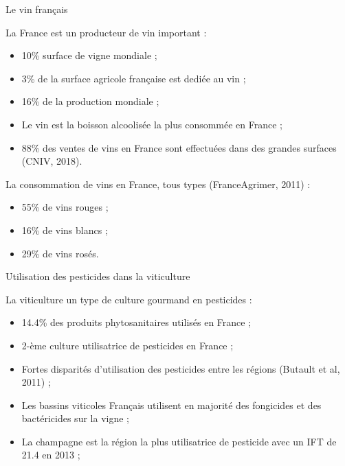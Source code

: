 \documentclass[11pt,ignorenonframetext,]{beamer}
\providecommand{\tightlist}{%
  \setlength{\itemsep}{0pt}\setlength{\parskip}{0pt}}
\begin{document}
\begin{frame}{Le vin français}
\protect\hypertarget{le-vin-francais}{}

La France est un producteur de vin important :

\begin{itemize}
\tightlist
\item
  10\% surface de vigne mondiale ;
\item
  3\% de la surface agricole française est dediée au vin ;
\item
  16\% de la production mondiale ;
\item
  Le vin est la boisson alcoolisée la plus consommée en France ;
\item
  88\% des ventes de vins en France sont effectuées dans des grandes
  surfaces (CNIV, 2018).
\end{itemize}

La consommation de vins en France, tous types (FranceAgrimer, 2011) :

\begin{itemize}
\tightlist
\item
  55\% de vins rouges ;
\item
  16\% de vins blancs ;
\item
  29\% de vins rosés.
\end{itemize}

\end{frame}

\begin{frame}{Utilisation des pesticides dans la viticulture}
\protect\hypertarget{utilisation-des-pesticides-dans-la-viticulture}{}

La viticulture un type de culture gourmand en pesticides :

\begin{itemize}
\tightlist
\item
  14.4\% des produits phytosanitaires utilisés en France ;
\item
  2-ème culture utilisatrice de pesticides en France ;
\item
  Fortes disparités d'utilisation des pesticides entre les régions
  (Butault et al, 2011) ;
\item
  Les bassins viticoles Français utilisent en majorité des fongicides et
  des bactéricides sur la vigne ;
\item
  La champagne est la région la plus utilisatrice de pesticide avec un
  IFT de 21.4 en 2013 ;
\end{itemize}

\end{frame}
\end{document}
